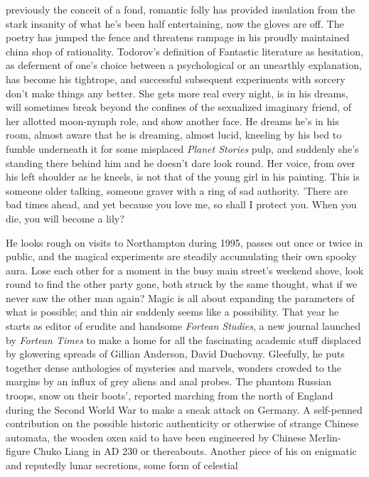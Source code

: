 \documentclass[
]{article}
\begin{document}
previously the conceit of a fond, romantic folly has provided insulation
from the stark insanity of what he's been half entertaining, now the
gloves are off. The poetry has jumped the fence and threatens rampage in
his proudly maintained china shop of rationality. Todorov's definition
of Fantastic literature as hesitation, as deferment of one's choice
between a psychological or an unearthly explanation, has become his
tightrope, and successful subsequent experiments with sorcery don't make
things any better. She gets more real every night, is in his dreams,
will sometimes break beyond the confines of the sexualized imaginary
friend, of her allotted moon-nymph role, and show another face. He
dreams he's in his room, almost aware that he is dreaming, almost lucid,
kneeling by his bed to fumble underneath it for some misplaced
\emph{Planet Stories} pulp, and suddenly she's standing there behind him
and he doesn't dare look round. Her voice, from over his left shoulder
as he kneels, is not that of the young girl in his painting. This is
someone older talking, someone graver with a ring of sad authority.
'There are bad times ahead, and yet because you love me, so shall I
protect you. When you die, you will become a lily? \par
He looks rough on visits to Northampton during 1995, passes out
once or twice in public, and the magical experiments are steadily
accumulating their own spooky aura. Lose each other for a moment in the
busy main street's weekend shove, look round to find the other party
gone, both struck by the same thought, what if we never saw the other
man again? Magic is all about expanding the parameters of what is
possible; and thin air suddenly seems like a possibility. That year he
starts as editor of erudite and handsome \emph{Fortean Studies}, a new
journal launched by \emph{Fortean Times} to make a home for all the
fascinating academic stuff displaced by glowering spreads of Gillian
Anderson, David Duchovny. Gleefully, he puts together dense anthologies
of mysteries and marvels, wonders crowded to the margins by an influx of
grey aliens and anal probes. The phantom Russian troops, snow on their
boots', reported marching from the north of England during the Second
World War to make a sneak attack on Germany. A self-penned contribution
on the possible historic authenticity or otherwise of strange Chinese
automata, the wooden oxen said to have been engineered by Chinese
Merlin-figure Chuko Liang in AD 230 or thereabouts. Another piece of his
on enigmatic and reputedly lunar secretions, some form of celestial
\end{document}
